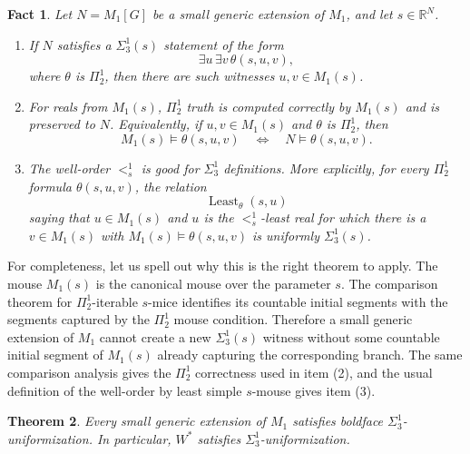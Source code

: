 \documentclass[a4paper,11pt]{article}
\newtheorem{theorem}{Theorem}[section]
\newtheorem{fact}[theorem]{Fact}
\begin{document}
\begin{fact}\label{fact:m1-capture-and-good-wellorder}
Let \(N=M_1[G]\) be a small generic extension of \(M_1\), and let
\(s\in\mathbb R^N\).
\begin{enumerate}
    \item If \(N\) satisfies a \(\Sigma^1_3(s)\) statement of the form
    \[
       \exists u\,\exists v\,\theta(s,u,v),
    \]
    where \(\theta\) is \(\Pi^1_2\), then there are such witnesses
    \(u,v\in M_1(s)\).

    \item For reals from \(M_1(s)\), \(\Pi^1_2\) truth is computed correctly by
    \(M_1(s)\) and is preserved to \(N\).  Equivalently, if
    \(u,v\in M_1(s)\) and \(\theta\) is \(\Pi^1_2\), then
    \[
       M_1(s)\models\theta(s,u,v)
       \quad\Longleftrightarrow\quad
       N\models\theta(s,u,v).
    \]

    \item The well-order \(<^1_s\) is good for \(\Sigma^1_3\) definitions.
    More explicitly, for every \(\Pi^1_2\) formula \(\theta(s,u,v)\), the
    relation
    \[
       \operatorname{Least}_{\theta}(s,u)
    \]
    saying that \(u\in M_1(s)\) and \(u\) is the \(<^1_s\)-least real for which
    there is a \(v\in M_1(s)\) with
    \(M_1(s)\models\theta(s,u,v)\) is uniformly \(\Sigma^1_3(s)\).
\end{enumerate}
\end{fact}

For completeness, let us spell out why this is the right theorem to apply.  The
mouse \(M_1(s)\) is the canonical mouse over the parameter \(s\).  The
comparison theorem for \(\Pi^1_2\)-iterable \(s\)-mice identifies its countable
initial segments with the segments captured by the \(\Pi^1_2\) mouse condition.
Therefore a small generic extension of \(M_1\) cannot create a new
\(\Sigma^1_3(s)\) witness without some countable initial segment of \(M_1(s)\)
already capturing the corresponding branch.  The same comparison analysis gives
the \(\Pi^1_2\) correctness used in item (2), and the usual definition of the
well-order by least simple \(s\)-mouse gives item (3).

\begin{theorem}\label{thm:small-m1-sigma13-uniformization}
Every small generic extension of \(M_1\) satisfies boldface
\(\Sigma^1_3\)-uniformization.  In particular, \(W^\ast\) satisfies
\(\Sigma^1_3\)-uniformization.
\end{theorem}
\end{document}

